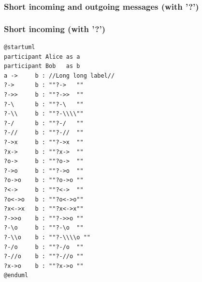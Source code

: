\subsubsection{Short incoming and outgoing messages (with '?')}
\subsubsection{Short incoming (with '?')}
\begin{verbatim}
@startuml
participant Alice as a
participant Bob   as b
a ->     b : //Long long label//
?->      b : ""?->   ""
?->>     b : ""?->>  ""
?-\      b : ""?-\   ""
?-\\     b : ""?-\\\\""
?-/      b : ""?-/   ""
?-//     b : ""?-//  ""
?->x     b : ""?->x  ""
?x->     b : ""?x->  ""
?o->     b : ""?o->  ""
?->o     b : ""?->o  ""
?o->o    b : ""?o->o ""
?<->     b : ""?<->  ""
?o<->o   b : ""?o<->o""
?x<->x   b : ""?x<->x""
?->>o    b : ""?->>o ""
?-\o     b : ""?-\o  ""
?-\\o    b : ""?-\\\\o ""
?-/o     b : ""?-/o  ""
?-//o    b : ""?-//o ""
?x->o    b : ""?x->o ""
@enduml
\end{verbatim}
